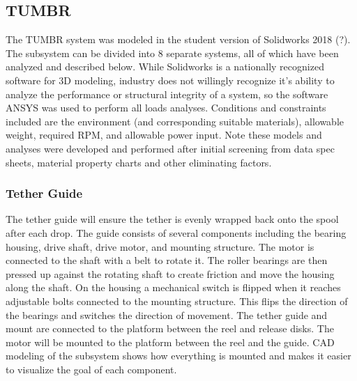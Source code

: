 
\subsection{TUMBR}

\indent\indent The TUMBR system was modeled in the student version of Solidworks 2018 (?). The subsystem can be divided into 8 separate systems, all of which have been analyzed and described below. While Solidworks is a nationally recognized software for 3D modeling, industry does not willingly recognize it's ability to analyze the performance or structural integrity of a system, so the software ANSYS was used to perform all loads analyses. Conditions and constraints included are the environment (and corresponding suitable materials), allowable weight, required RPM, and allowable power input. Note these models and analyses were developed and performed after initial screening from data spec sheets, material property charts and other eliminating factors.





\subsubsection{Tether Guide}

\indent\indent The tether guide will ensure the tether is evenly wrapped back onto the spool after each drop. The guide consists of several components including the bearing housing, drive shaft, drive motor, and mounting structure. The motor is connected to the shaft with a belt to rotate it. The roller bearings are then pressed up against the rotating shaft to create friction and move the housing along the shaft. On the housing a mechanical switch is flipped when it reaches adjustable bolts connected to the mounting structure. This flips the direction of the bearings and switches the direction of movement. The tether guide and mount are connected to the platform between the reel and release disks. The motor will be mounted to the platform between the reel and the guide. CAD modeling of the subsystem shows how everything is mounted and makes it easier to visualize the goal of each component.

